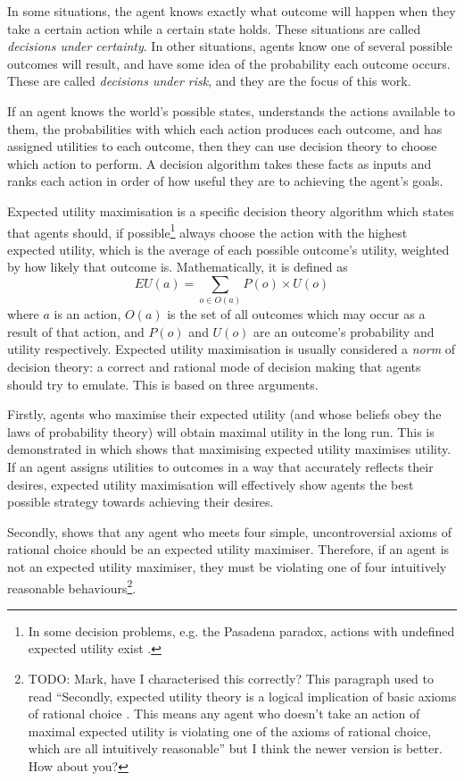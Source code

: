 \documentclass{article}
\begin{document}
In some situations, the agent knows exactly what outcome will happen when they take a certain action while a certain state holds. These situations are called \textit{decisions under certainty}. In other situations, agents know one of several possible outcomes will result, and have some idea of the probability each outcome occurs. These are called \textit{decisions under risk}, and they are the focus of this work.

If an agent knows the world's possible states, understands the actions available to them, the probabilities with which each action produces each outcome, and has assigned utilities to each outcome, then they can use decision theory to choose which action to perform. A decision algorithm takes these facts as inputs and ranks each action in order of how useful they are to achieving the agent's goals. 

Expected utility maximisation is a specific decision theory algorithm which states that agents should, if possible\footnote{In some decision problems, e.g. the Pasadena paradox, actions with undefined expected utility exist \citep{nover2004vexing}.} always choose the action with the highest expected utility, which is the average of each possible outcome's utility, weighted by how likely that outcome is. Mathematically, it is defined as \[EU(a)=\sum_{o \in O(a)}P(o)\times U(o)\] where \(a\) is an action, \(O(a)\) is the set of all outcomes which may occur as a result of that action, and \(P(o)\) and \(U(o)\) are an outcome's probability and utility respectively. Expected utility maximisation is usually considered a \textit{norm} of decision theory: a correct and rational mode of decision making that agents should try to emulate. This is based on three arguments.

Firstly, agents who maximise their expected utility (and whose beliefs obey the laws of probability theory) will obtain maximal utility in the long run. This is demonstrated in \citep{von1944games} which shows that maximising expected utility maximises utility. If an agent assigns utilities to outcomes in a way that accurately reflects their desires, expected utility maximisation will effectively show agents the best possible strategy towards achieving their desires. 

Secondly, \citep{von1944games} shows that any agent who meets four simple, uncontroversial axioms of rational choice should be an expected utility maximiser. Therefore, if an agent is not an expected utility maximiser, they must be violating one of four intuitively reasonable behaviours\footnote{TODO: Mark, have I characterised this correctly? This paragraph used to read ``Secondly, expected utility theory is a logical implication of basic axioms of rational choice \citep{von1944games}. This means any agent who doesn't take an action of maximal expected utility is violating one of the axioms of rational choice, which are all intuitively reasonable'' but I think the newer version is better. How about you?}. 
\end{document}
